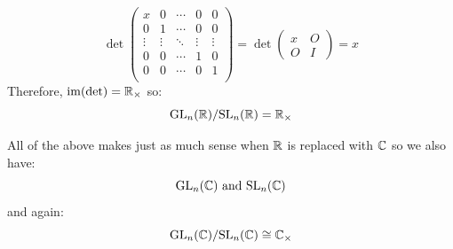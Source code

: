 \documentclass[../main.tex]{subfiles}
\begin{document}
\[
  \det \begin{pmatrix}
  x & 0 & \cdots & 0 & 0 \\
  0 & 1 & \cdots & 0 & 0 \\
  \vdots & \vdots & \ddots & \vdots & \vdots \\
  0 & 0 & \cdots & 1 &  0\\
  0 & 0 & \cdots & 0 & 1 \\
  \end{pmatrix} =
  \det \left(\begin{array}{c|c}
    x & O \\ \hline
    O & I
  \end{array}\right) = x
\]
Therefore, $\operatorname{im}(\det) = \mathbb{R}_\times$ so:
\[
  \mathrm{GL}_n(\mathbb{R})/\mathrm{SL}_n(\mathbb{R}) = \mathbb{R}_\times
\]

All of the above makes just as much sense when $\mathbb{R}$ is replaced with $\mathbb{C}$ so we also have:
\[
  \mathrm{GL}_n(\mathbb{C}) \text{ and } \mathrm{SL}_n(\mathbb{C})
\]
and again:
\[
  \mathrm{GL}_n(\mathbb{C}) / \mathrm{SL}_n(\mathbb{C}) \cong \mathbb{C}_\times
\]
\end{document}
